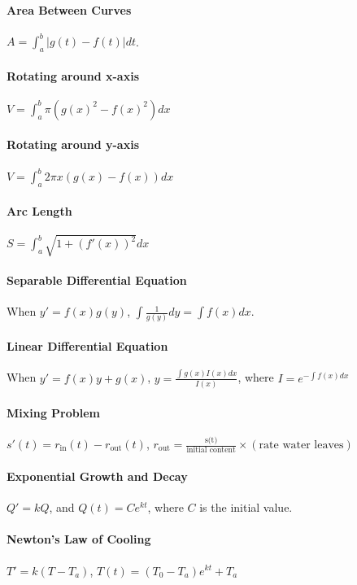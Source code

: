 \documentclass[10pt,letter]{article}
\begin{document}
\paragraph{Area Between Curves}
$A=\int_a^b|g(t)-f(t)|dt$.

\paragraph{Rotating around x-axis}
$V=\int_a^b\pi (g(x)^2-f(x)^2)dx$

\paragraph{Rotating around y-axis}
$V=\int_a^b2\pi x(g(x)-f(x))dx$

\paragraph{Arc Length}
$S=\int_a^b\sqrt{1+(f'(x))^2}dx$

\paragraph{Separable Differential Equation}
When $y'=f(x)g(y)$, $\int\frac{1}{g(y)}dy=\int f(x)dx$. 

\paragraph{Linear Differential Equation} 
When $y'=f(x)y+g(x)$, $y=\frac{\int g(x)I(x)dx}{I(x)}$, where $I=e^{-\int f(x)dx}$ 

\paragraph{Mixing Problem}
$s'(t)=r_{\text{in}}(t)-r_{\text{out}}(t)$, $r_\text{out}=\frac{\text{s(t)}}{\text{initial content}}\times(\text{rate water leaves})$

\paragraph{Exponential Growth and Decay}
$Q'=kQ$, and $Q(t)=Ce^{kt}$, where $C$ is the initial value.

\paragraph{Newton's Law of Cooling}
$T'=k(T-T_a)$, $T(t)=(T_0-T_a)e^{kt}+T_a$
\end{document}
